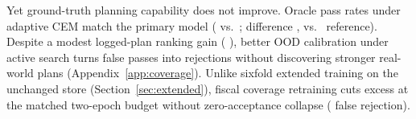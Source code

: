 Yet ground-truth planning capability does not improve. Oracle pass rates under  adaptive CEM match the primary model (\CovAdAllCovOrAcc{} vs.\ \CovAdAllMainOrAcc{}; difference \CovAdAllDiffOrAcc{} \ci{\CovAdAllDiffOrAccCI}, vs.\ \CovAdAllPerfOrAcc{} reference). \CovFalseRejSentence{} Despite a modest logged-plan ranking gain (\CovDecFidDiff{} \ci{\CovDecFidDiffCI}), better OOD calibration under active search turns false passes into rejections without discovering stronger real-world plans (Appendix~\ref{app:coverage}). Unlike sixfold extended training on the unchanged store (Section~\ref{sec:extended}), fiscal coverage retraining cuts excess at the matched two-epoch budget without zero-acceptance collapse (\CovAdAllCovFalseRej{} false rejection).
